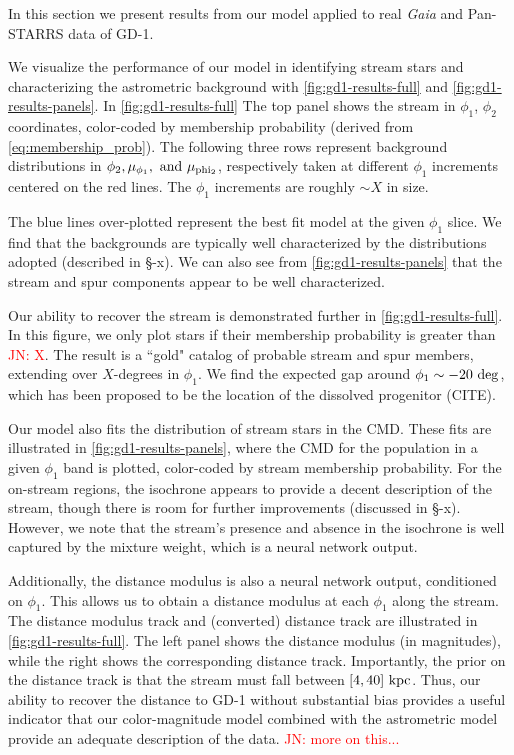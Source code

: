 \documentclass[twocolumn]{aastex631}
\newcommand{\JN}[1]{{\textcolor{red}{JN: #1}}}
\begin{document}
            In this section we present results from our model applied to real {\it Gaia} and Pan-STARRS data of GD-1. 

            We visualize the performance of our model in identifying stream stars and characterizing the astrometric background with \autoref{fig:gd1-results-full} and \autoref{fig:gd1-results-panels}. In \autoref{fig:gd1-results-full} The top panel shows the stream in $\phi_1$, $\phi_2$ coordinates, color-coded by membership probability (derived from \autoref{eq:membership_prob}). The following three rows represent background distributions in $\phi_2, \mu_{\phi_1}, \rm{\ and} \ \mu_{\rm phi_2}$, respectively taken at different $\phi_1$ increments centered on the red lines. The $\phi_1$ increments are roughly $\sim X$ in size. 

            The blue lines over-plotted represent the best fit model at the given $\phi_1$ slice. We find that the backgrounds are typically well characterized by the distributions adopted (described in \S-x). We can also see from \autoref{fig:gd1-results-panels}
            that the stream and spur components appear to be well characterized. 
            
            Our ability to recover the stream is demonstrated further in \autoref{fig:gd1-results-full}. In this figure, we only plot stars if their membership probability is greater than \JN{X}. The result is a ``gold" catalog of probable stream and spur members, extending over $X$-degrees in $\phi_1$. We find the expected gap around $\phi_1 \sim -20~\rm{deg}$, which has been proposed to be the location of the dissolved progenitor (CITE).

            Our model also fits the distribution of stream stars in the CMD. These fits are illustrated in \autoref{fig:gd1-results-panels}, where the CMD for the population in a given $\phi_1$ band is plotted, color-coded by stream membership probability. For the on-stream regions, the isochrone appears to provide a decent description of the stream, though there is room for further improvements (discussed in \S-x). However, we note that the stream's presence and absence in the isochrone is well captured by the mixture weight, which is a neural network output. 
            
            Additionally, the distance modulus is also a neural network output, conditioned on $\phi_1$. This allows us to obtain a distance modulus at each $\phi_1$ along the stream. The distance modulus track and (converted) distance track are illustrated in \autoref{fig:gd1-results-full}. The left panel shows the distance modulus (in magnitudes), while the right shows the corresponding distance track. Importantly, the prior on the distance track is that the stream must fall between $[4,40]~\rm{kpc}$. Thus, our ability to recover the distance to GD-1 without substantial bias provides a useful indicator that our color-magnitude model combined with the astrometric model provide an adequate description of the data. \JN{more on this...}
\end{document}
